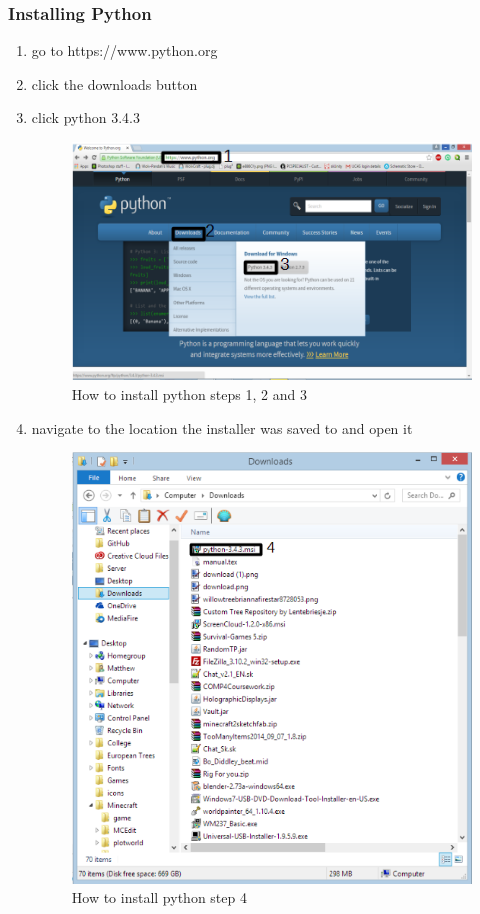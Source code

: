 \subsubsection{Installing Python}
\begin{enumerate}
	\item go to https://www.python.org
	\item click the downloads button
	\item click python 3.4.3
\begin{figure}[H]
	\includegraphics{./manual/images/python-installation-instructions-1.png}
	\caption{How to install python steps 1, 2 and 3}
\end{figure}

	\item navigate to the location the installer was saved to and open it
	
\begin{figure}[H]
	\includegraphics{./manual/images/python-installation-instructions-2.png}
	\caption{How to install python step 4}
\end {figure}


\end{enumerate}

